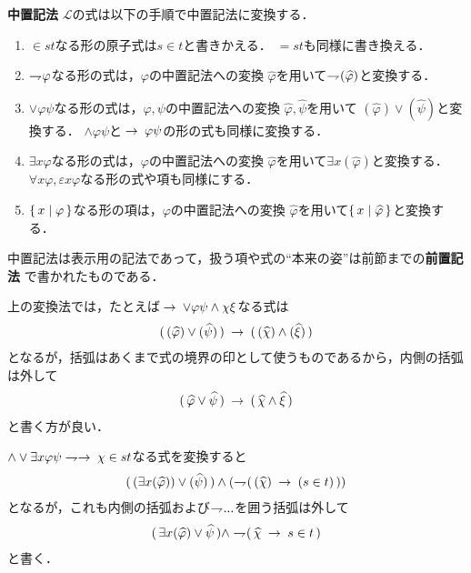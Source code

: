 	\begin{itembox}[l]{{\bf 中置記法}}
			$\mathcal{L}$の式は以下の手順で中置記法に変換する．
			\begin{enumerate}
				\item $\in s t$なる形の原子式は$s \in t$と書きかえる．
					$= s t$も同様に書き換える．
					
				\item $\rightharpoondown\hspace{-0.25em} \varphi$なる形の式は，$\varphi$の中置記法への変換
					$\widehat{\varphi}$を用いて$\rightharpoondown\hspace{-0.25em} (\widehat{\varphi})$と変換する．
				
				\item $\vee \varphi \psi$なる形の式は，$\varphi,\psi$の中置記法への変換
					$\widehat{\varphi},\widehat{\psi}$を用いて
					$(\widehat{\varphi}) \vee (\widehat{\psi})$と変換する．
					$\wedge \varphi \psi$と$\hspace{0.25em}\rightarrow\hspace{0.25em} \varphi \psi$の形の式も同様に変換する．
				
				\item $\exists x \varphi$なる形の式は，$\varphi$の中置記法への変換
					$\widehat{\varphi}$を用いて$\exists x (\widehat{\varphi})$と変換する．
					$\forall x \varphi,\varepsilon x \varphi$なる形の式や項も同様にする．
					
				\item $\{\, x \mid \varphi\, \}$なる形の項は，$\varphi$の中置記法への変換
					$\widehat{\varphi}$を用いて$\{\, x \mid \widehat{\varphi}\, \}$と変換する．
			\end{enumerate}
			中置記法は表示用の記法であって，扱う項や式の``本来の姿''は前節までの{\bf 前置記法}
			で書かれたものである．
	\end{itembox}
	
	上の変換法では，たとえば$\hspace{0.25em}\rightarrow\hspace{0.25em} \vee \varphi \psi \wedge \chi \xi$なる式は
	\begin{align}
		(\, (\widehat{\varphi}) \vee (\widehat{\psi})\, ) 
		\hspace{0.25em}\rightarrow\hspace{0.25em} (\, (\widehat{\chi}) \wedge (\widehat{\xi})\, )
	\end{align}
	となるが，括弧はあくまで式の境界の印として使うものであるから，内側の括弧は外して
	\begin{align}
		(\, \widehat{\varphi} \vee \widehat{\psi}\, ) 
		\hspace{0.25em}\rightarrow\hspace{0.25em} (\, \widehat{\chi} \wedge \widehat{\xi}\, )
	\end{align}
	と書く方が良い．
	
	$\wedge \vee \exists x \varphi \psi \negation \rarrow \chi \in s t$なる式を変換すると
	\begin{align}
		(\, (\exists x (\widehat{\varphi})) \vee (\widehat{\psi})\, ) \wedge (\rightharpoondown\hspace{-0.25em} (\, (\widehat{\chi}) \hspace{0.25em}\rightarrow\hspace{0.25em} (s \in t)\, ))
	\end{align}
	となるが，これも内側の括弧および$\rightharpoondown\hspace{-0.25em} ...$を囲う括弧は外して
	\begin{align}
		(\, \exists x (\widehat{\varphi}) \vee \widehat{\psi}\, ) \wedge \rightharpoondown\hspace{-0.25em} (\, \widehat{\chi} \hspace{0.25em}\rightarrow\hspace{0.25em} s \in t\, )
	\end{align}
	と書く．
	

